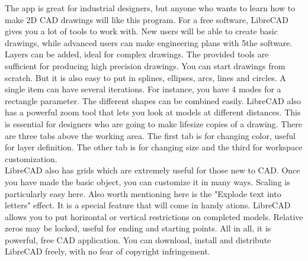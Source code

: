 The  app  is  great  for  industrial  designers,  but  anyone  who  wants  to  learn  how  to  make  2D  CAD
drawings  will  like  this  program.  For  a  free  software,  LibreCAD  gives  you  a  lot  of  tools  to  work  with.
New  users  will  be  able  to  create  basic drawings, while advanced users can make engineering plans with
5the  software.  Layers  can  be  added,  ideal  for  complex   drawings.  The  provided  tools  are  sufficient  for
producing  high  precision  drawings.  You  can  start  drawings  from  scratch.  But  it  is  also  easy  to  put  in
splines,  ellipses,  arcs,  lines  and   circles.  A  single  item  can  have  several iterations. For instance, you have
4 modes for a rectangle parameter. The different shapes can be combined easily.
LibreCAD  also  has  a  powerful  zoom  tool  that  lets  you  look  at  models  at  different  distances.  This  is
essential  for  designers  who  are  going  to  make  life­size  copies  of  a  drawing.  There are three tabs above
the  working  area.   The  first  tab  is  for  changing  color,  useful  for  layer  definition.   The  other  tab  is  for
changing size and the third for workspace customization.\\

  LibreCAD also has grids which are extremely useful for those new to CAD. Once you have  made the
basic  object,  you can customize it in many ways. Scaling is particularly easy here. Also worth mentioning
here  is  the  "Explode  text  into  letters"  effect.   It  is  a  special  feature  that  will come in handy ations.
LibreCAD  allows  you  to  put  horizontal  or vertical restrictions on completed models. Relative zeros may
be  locked,  useful  for   ending  and  starting  points.  All  in  all,  it is powerful, free CAD application. You can
download, install and distribute LibreCAD freely, with no fear of copyright infringement.